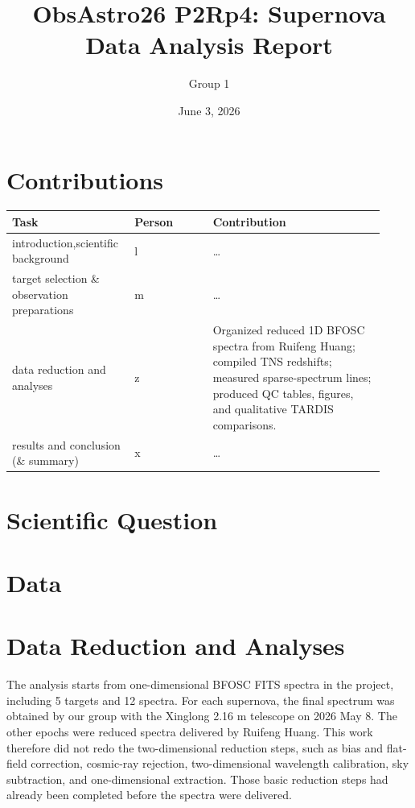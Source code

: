 \documentclass[11pt]{article}
\title{ObsAstro26 P2Rp4: Supernova Data Analysis Report}
\author{Group 1}
\date{June 3, 2026}
\begin{document}
\maketitle

\section*{Contributions}
\medskip
\noindent\begin{tabular}{p{0.28\linewidth}p{0.20\linewidth}p{0.44\linewidth}}
\toprule
Task & Person & Contribution \\
\midrule
introduction,scientific background & l & \dots \\

target selection \& observation preparations & m & \dots \\

data reduction and analyses & z & Organized reduced 1D BFOSC spectra from Ruifeng Huang; compiled TNS redshifts; measured sparse-spectrum lines; produced QC tables, figures, and qualitative TARDIS comparisons. \\

results and conclusion (\& summary) & x & \dots \\

\bottomrule
\end{tabular}

\tableofcontents
\newpage

\section{Scientific Question}

\section{Data}

\section{Data Reduction and Analyses}
The analysis starts from one-dimensional BFOSC FITS spectra in the project, including 5 targets and 12 spectra. For each supernova, the final spectrum was obtained by our group with the Xinglong 2.16 m telescope on 2026 May 8. The other epochs were reduced spectra delivered by Ruifeng Huang. This work therefore did not redo the two-dimensional reduction steps, such as bias and flat-field correction, cosmic-ray rejection, two-dimensional wavelength calibration, sky subtraction, and one-dimensional extraction. Those basic reduction steps had already been completed before the spectra were delivered.
\end{document}
